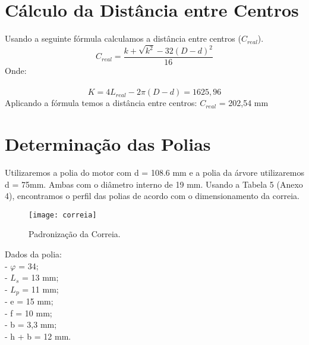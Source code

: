 \documentclass[a4paper, 11pt]{article}
\begin{document}
\section{C\'alculo da Dist\^ancia entre Centros}
Usando a seguinte f\'ormula calculamos a dist\^ancia entre centros ($C_{real}$).\\
$$C_{real}=\frac{k+\sqrt{k^2}-32(D-d)^2}{16}$$
Onde:\\\\
$$K=4L_{real}-2\pi(D-d)=1625,96$$
Aplicando a f\'ormula temos a dist\^ancia entre centros: $C_{real}$ = 202,54 mm\\
\section{Determina\c{c}\~ao das Polias}
Utilizaremos a polia do motor com d = 108.6 mm e a polia da \'arvore
utilizaremos d = 75mm. Ambas com o di\^ametro interno de 19 mm. Usando a Tabela
5 (Anexo 4), encontramos o perfil das polias de acordo com o dimensionamento da
correia.\\
\begin{figure}[!htb]
    \centering
    \texttt{[image: correia]}
    \caption{Padroniza\c{c}\~ao da Correia.}
    \label{figRotulo}
  \end{figure}

Dados da polia:\\
- $\varphi$ = 34;\\
- $L_s$ = 13 mm;\\
- $L_p$ = 11 mm;\\
- e = 15 mm;\\
- f = 10 mm;\\
- b = 3,3 mm;\\
- h + b = 12 mm.\\
\end{document}
